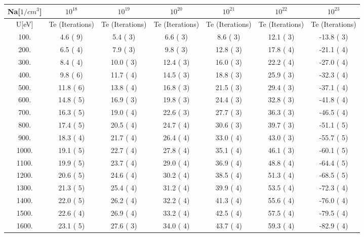 \begin{tabular}{|c||c|c|c|c|c|c|}
\hline
Na[$1/cm^3$] & $10^{18}$ & $10^{19}$ & $10^{20}$ & $10^{21}$ & $10^{22}$ & $10^{23}$\tabularnewline
\hline
U[eV] & Te (Iterations) &  Te (Iterations) &  Te (Iterations) &  Te (Iterations) &  Te (Iterations) &  Te (Iterations) \tabularnewline
\hline
\hline
  100. &     4.6 (      9) &     5.4 (      3) &     6.6 (      3) &     8.6 (      3) &    12.1 (      3) &   -13.8 (      3)\tabularnewline
\hline
  200. &     6.5 (      4) &     7.9 (      3) &     9.8 (      3) &    12.8 (      3) &    17.8 (      4) &   -21.1 (      4)\tabularnewline
\hline
  300. &     8.4 (      4) &    10.0 (      3) &    12.4 (      3) &    16.0 (      3) &    22.2 (      4) &   -27.0 (      4)\tabularnewline
\hline
  400. &     9.8 (      6) &    11.7 (      4) &    14.5 (      3) &    18.8 (      3) &    25.9 (      3) &   -32.3 (      4)\tabularnewline
\hline
  500. &    11.8 (      6) &    13.8 (      4) &    16.8 (      3) &    21.5 (      3) &    29.4 (      3) &   -37.1 (      4)\tabularnewline
\hline
  600. &    14.8 (      5) &    16.9 (      3) &    19.8 (      3) &    24.4 (      3) &    32.8 (      3) &   -41.8 (      4)\tabularnewline
\hline
  700. &    16.3 (      5) &    19.0 (      4) &    22.6 (      3) &    27.7 (      3) &    36.3 (      3) &   -46.5 (      4)\tabularnewline
\hline
  800. &    17.4 (      5) &    20.5 (      4) &    24.7 (      4) &    30.6 (      3) &    39.7 (      3) &   -51.1 (      5)\tabularnewline
\hline
  900. &    18.3 (      4) &    21.7 (      4) &    26.4 (      4) &    33.0 (      4) &    43.0 (      3) &   -55.7 (      5)\tabularnewline
\hline
 1000. &    19.1 (      5) &    22.7 (      4) &    27.8 (      4) &    35.1 (      4) &    46.1 (      3) &   -60.1 (      5)\tabularnewline
\hline
 1100. &    19.9 (      5) &    23.7 (      4) &    29.0 (      4) &    36.9 (      4) &    48.8 (      4) &   -64.4 (      5)\tabularnewline
\hline
 1200. &    20.6 (      5) &    24.6 (      4) &    30.2 (      4) &    38.5 (      4) &    51.3 (      4) &   -68.5 (      5)\tabularnewline
\hline
 1300. &    21.3 (      5) &    25.4 (      4) &    31.2 (      4) &    39.9 (      4) &    53.5 (      4) &   -72.3 (      4)\tabularnewline
\hline
 1400. &    22.0 (      5) &    26.2 (      4) &    32.2 (      4) &    41.3 (      4) &    55.6 (      4) &   -76.0 (      4)\tabularnewline
\hline
 1500. &    22.6 (      4) &    26.9 (      4) &    33.2 (      4) &    42.5 (      4) &    57.5 (      4) &   -79.5 (      4)\tabularnewline
\hline
 1600. &    23.1 (      5) &    27.6 (      3) &    34.0 (      4) &    43.7 (      4) &    59.3 (      4) &   -82.9 (      4)\tabularnewline

\end{tabular}
